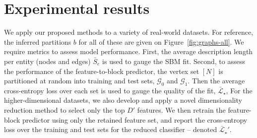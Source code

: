 \section{Experimental results}
\label{sec:experiments}

We apply our proposed methods to a variety of real-world datasets.
For reference, the inferred partitions $b$ for all of these are given on Figure~\ref{fig:graphs-all}.
We require metrics to assess model performance. 
First, the average
description length per entity (nodes and edges) 
$\bar{S}_e$ 
is used to gauge the SBM fit.
Second, to assess the performance of the feature-to-block predictor, 
the vertex set $[N]$ 
is partitioned at random into training and test sets, $\mathcal{G}_0$ and $\mathcal{G}_1$. 
Then the average cross-entropy loss 
over each set is used to gauge the quality of the fit, $\bar{\mathcal{L}}_\star$,
%
%
%
For the higher-dimensional datasets, we also develop and apply a novel 
dimensionality reduction method to select only the top $D'$ features.  
We then retrain the feature-block predictor using only the retained 
feature set, and report the cross-entropy loss over the training and 
test sets for the reduced classifier -- 
denoted $\bar{\mathcal{L}}_\star'$.


